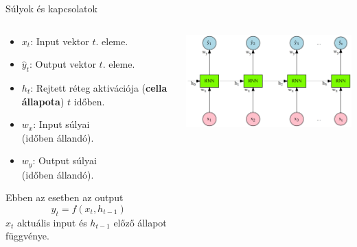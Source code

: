 \documentclass[english, aspectratio=169]{beamer}
\begin{document}
\begin{frame}{Súlyok és kapcsolatok}
\begin{columns}
\begin{column}{.4\textwidth}
\hspace{-2cm}
\begin{itemize}
	\item $x_t$: Input vektor $t$. eleme.
	\item $\hat{y}_t$: Output vektor $t$. eleme.
	\item $h_t$: Rejtett réteg aktivációja (\textbf{cella állapota}) $t$ időben.
	\item $w_x$: Input súlyai \\(időben állandó).
	\item $w_y$: Output súlyai \\(időben állandó).
\end{itemize}
Ebben az esetben az output
\[
\hat{y}_t = f(x_t, h_{t-1})
\]
$x_t$ aktuális input és $h_{t-1}$ előző állapot függvénye.
\end{column}
\begin{column}{.7\textwidth}
\begin{center}
\includegraphics[width=9.5cm, keepaspectratio]{graphs/recurrent_5.png}
\end{center}
\end{column}
\end{columns}
\end{frame}
\end{document}
